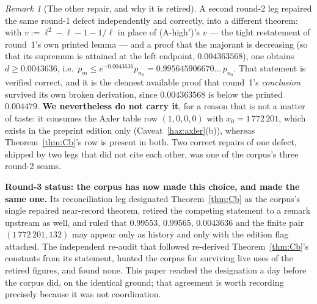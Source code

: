 \documentclass[11pt,a4paper]{article}
\theoremstyle{plain}
\theoremstyle{definition}
\theoremstyle{remark}
\newtheorem{remark}[theorem]{Remark}
\begin{document}
\begin{remark}[The other repair, and why it is retired]
\label{rem:retired}
A second round-2 leg repaired the same round-1 defect independently and correctly, into a
different theorem: with $v := \ell^2 - \ell - 1 - 1/\ell$ in place of (A-high$'$)'s $v$ --- the
tight restatement of round~1's own printed lemma --- and a proof that the majorant is
decreasing (so that its supremum is attained at the left endpoint, $0.004363568$), one obtains
$d \ge 0.0043636$, i.e.\ $p_m \le e^{-0.0043636}p_{n_0} = 0.995645906670\ldots\,p_{n_0}$. That
statement is verified correct, and it is the cleanest available proof that round~1's
\emph{conclusion} survived its own broken derivation, since $0.004363568$ is below the printed
$0.004479$. \textbf{We nevertheless do not carry it}, for a reason that is not a matter of
taste: it consumes the Axler table row $(1,0,0,0)$ with $x_0 = 1\,772\,201$, which exists in
the preprint edition only (Caveat~\ref{haz:axler}(b)), whereas Theorem~\ref{thm:Cb}'s row is
present in both. Two correct repairs of one defect, shipped by two legs that did not cite each
other, was one of the corpus's three round-2 seams.

\textbf{Round-3 status: the corpus has now made this choice, and made the same one.} Its
reconciliation leg designated Theorem~\ref{thm:Cb} as the corpus's single repaired near-record
theorem, retired the competing statement to a remark upstream as well, and ruled that
$0.99553$, $0.99565$, $0.0043636$ and the finite pair $(1\,772\,201, 132)$ may appear only as
history and only with the edition flag attached. The independent re-audit that followed
re-derived Theorem~\ref{thm:Cb}'s constants from its statement, hunted the corpus for surviving
live uses of the retired figures, and found none. This paper reached the designation a day
before the corpus did, on the identical ground; that agreement is worth recording precisely
because it was not coordination.
\end{remark}
\end{document}
